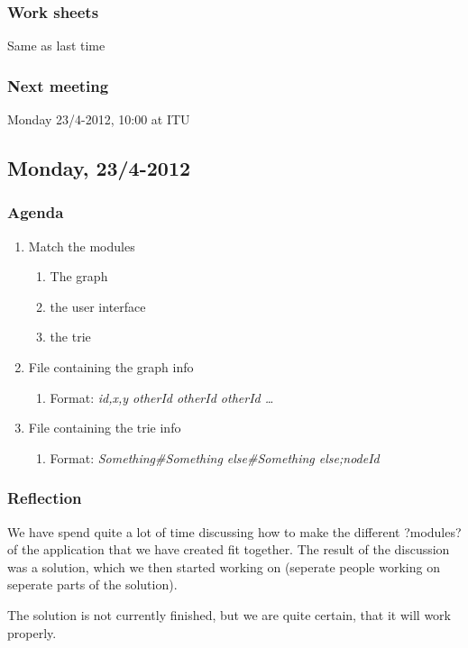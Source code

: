 \documentclass[a4paper,11pt]{article}
\begin{document}
\subsubsection*{Work sheets}
Same as last time

\subsubsection*{Next meeting}
Monday 23/4-2012, 10:00 at ITU


\pagebreak
\subsection{Monday, 23/4-2012}

\subsubsection*{Agenda}
\begin{enumerate}
	\item Match the modules
	\begin{enumerate}
		\item The graph
		\item the user interface
		\item the trie
	\end{enumerate}
	\item File containing the graph info
	\begin{enumerate}
		\item Format: \textsl{id,x,y otherId otherId otherId \ldots}
	\end{enumerate}
	\item File containing the trie info
	\begin{enumerate}
		\item Format: \textsl{Something\#Something else\#Something else;nodeId}
	\end{enumerate}
\end{enumerate}

\subsubsection*{Reflection}
We have spend quite a lot of time discussing how to make the different ?modules? of the application that we have created fit together.
The result of the discussion was a solution, which we then started working on (seperate people working on seperate parts of the solution).

The solution is not currently finished, but we are quite certain, that it will work properly.
\end{document}

